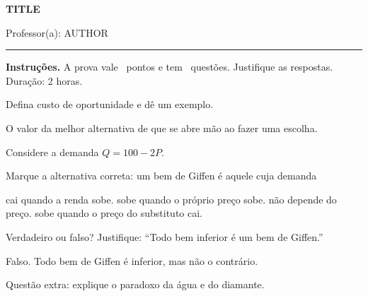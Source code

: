 \documentclass[11pt,a4paper,addpoints]{exam}
\begin{document}
\begin{center}
  {\Large\bfseries {{TITLE}}}\par\medskip
  Professor(a): {{AUTHOR}}\par
  {\color{tocaHoney}\rule{3cm}{2pt}}
\end{center}

\vspace{0.5em}
\noindent{}\hfill{}

\vspace{1em}
\begin{center}
  \gradetable[h][questions]
\end{center}

\noindent\textbf{Instruções.} A prova vale \numpoints\ pontos e tem \numquestions\ questões. Justifique as respostas. Duração: 2 horas.

\begin{questions}

\question[2] Defina custo de oportunidade e dê um exemplo.
\begin{solution}
  O valor da melhor alternativa de que se abre mão ao fazer uma escolha.
\end{solution}
\vspace{4cm}

\question Considere a demanda $Q = 100 - 2P$.

\question[1] Marque a alternativa correta: um bem de Giffen é aquele cuja demanda
\begin{checkboxes}
  \choice cai quando a renda sobe.
  \CorrectChoice sobe quando o próprio preço sobe.
  \choice não depende do preço.
  \choice sobe quando o preço do substituto cai.
\end{checkboxes}

\question[2] Verdadeiro ou falso? Justifique: ``Todo bem inferior é um bem de Giffen.''
\begin{solution}
  Falso. Todo bem de Giffen é inferior, mas não o contrário.
\end{solution}
\vspace{4cm}

\bonusquestion[1] Questão extra: explique o paradoxo da água e do diamante.
\vspace{3cm}

\end{questions}
\end{document}
